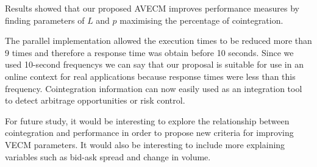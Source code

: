 Results showed that our proposed AVECM improves performance measures by finding
parameters of $L$ and $p$ maximising the percentage of cointegration. 

The parallel implementation allowed the execution times to be reduced more than
9 times and therefore a response time was obtain before 10 seconds. Since we
used 10-second frequencys we can say that our proposal is suitable for use in an
online context for real applications because response times were less than this
frequency. Cointegration information can now easily used as an integration tool
to detect arbitrage opportunities or risk control.

For future study, it would be interesting to explore the relationship between
cointegration and performance in order to propose new criteria for improving
VECM parameters. It would also be interesting to include more explaining
variables such as bid-ask spread and change in volume.

